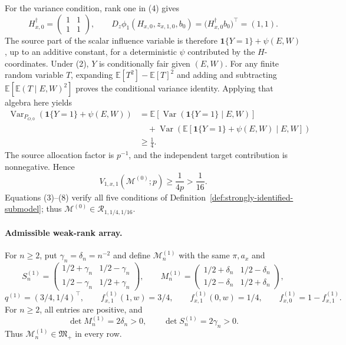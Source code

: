 For the variance condition, rank one in (4) gives
\[
H_{x,0}^{\dagger}=\begin{pmatrix}1&1\\1&1\end{pmatrix},
\qquad
D_z\phi_1(H_{x,0},z_{x,1,0},b_0)
=\bigl(H_{x,0}^{\dagger}b_0\bigr)^{\top}=(1,1).
\tag{6}
\]
The source part of the scalar influence variable is therefore \(\mathbf 1\{Y=1\}+\psi(E,W)\), up to an additive constant, for a deterministic \(\psi\) contributed by the \(H\)-coordinates.  Under (2), \(Y\) is conditionally fair given \((E,W)\).  For any finite random variable \(T\), expanding \(\mathbb E[T^2]-\mathbb E[T]^2\) and adding and subtracting \(\mathbb E[\mathbb E(T\mid E,W)^2]\) proves the conditional variance identity.  Applying that algebra here yields
\[
\begin{aligned}
\operatorname{Var}_{P_{O,0}}\!\left(\mathbf 1\{Y=1\}+\psi(E,W)\right)
&=\mathbb E\!\left[\operatorname{Var}(\mathbf 1\{Y=1\}\mid E,W)\right]\\
&\quad+\operatorname{Var}\!\left(\mathbb E[\mathbf 1\{Y=1\}+\psi(E,W)\mid E,W]\right)\\
&\ge\frac14.
\end{aligned}
\tag{7}
\]
The source allocation factor is \(p^{-1}\), and the independent target contribution is nonnegative.  Hence
\[
V_{1,x,1}(\mathcal M^{(0)};p)\ge\frac1{4p}>\frac1{16}.
\tag{8}
\]
Equations (3)--(8) verify all five conditions of Definition~\ref{def:strongly-identified-submodel}; thus \(\mathcal M^{(0)}\in\mathcal R_{1,1/4,1/16}\).

\paragraph{Admissible weak-rank array.}
For \(n\ge2\), put \(\gamma_n=\delta_n=n^{-2}\) and define \(\mathcal M^{(1)}_n\) with the same \(\pi,a_x\) and
\[
S^{(1)}_n=\begin{pmatrix}1/2+\gamma_n&1/2-\gamma_n\\1/2-\gamma_n&1/2+\gamma_n\end{pmatrix},
\qquad
M^{(1)}_n=\begin{pmatrix}1/2+\delta_n&1/2-\delta_n\\1/2-\delta_n&1/2+\delta_n\end{pmatrix},
\]
\[
q^{(1)}=(3/4,1/4)^{\top},\qquad
f^{(1)}_{x,1}(1,w)=3/4,\qquad
f^{(1)}_{x,1}(0,w)=1/4,\qquad
f^{(1)}_{x,0}=1-f^{(1)}_{x,1}.
\tag{9}
\]
For \(n\ge2\), all entries are positive, and
\[
\det M^{(1)}_n=2\delta_n>0,
\qquad
\det S^{(1)}_n=2\gamma_n>0.
\tag{10}
\]
Thus \(\mathcal M^{(1)}_n\in\mathfrak M_{+}\) in every row.

